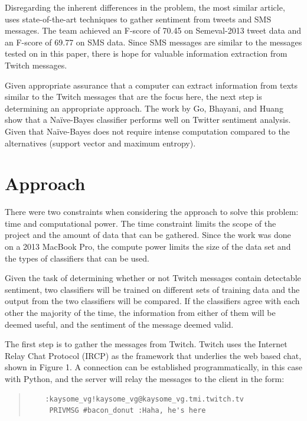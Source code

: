 \documentclass[12pt]{article}
\begin{document}
Disregarding the inherent differences in the problem, the most similar article, \cite{Kiritchenko:1} uses state-of-the-art techniques to gather sentiment from tweets and SMS messages. The team achieved an F-score of 70.45 on Semeval-2013 tweet data and an F-score of 69.77 on SMS data. Since SMS messages are similar to the messages tested on in this paper, there is hope for valuable information extraction from Twitch messages.

Given appropriate assurance that a computer can extract information from texts similar to the Twitch messages that are the focus here, the next step is determining an appropriate approach. The work by Go, Bhayani, and Huang \cite{go2009twitter} show that a Naïve-Bayes classifier performs well on Twitter sentiment analysis. Given that Naïve-Bayes does not require intense computation compared to the alternatives (support vector and maximum entropy). 
 

\section{Approach}

There were two constraints when considering the approach to solve this problem: time and computational power. The time constraint limits the scope of the project and the amount of data that can be gathered. Since the work was done on a 2013 MacBook Pro, the compute power limits the size of the data set and the types of classifiers that can be used. 

Given the task of determining whether or not Twitch messages contain detectable sentiment, two classifiers will be trained on different sets of training data and the output from the two classifiers will be compared. If the classifiers agree with each other the majority of the time, the information from either of them will be deemed useful, and the sentiment of the message deemed valid. 

The first step is to gather the messages from Twitch. Twitch uses the Internet Relay Chat Protocol (IRCP) as the framework that underlies the web based chat, shown in Figure 1. A connection can be established programmatically, in this case with Python, and the server will relay the messages to the client in the form:
\begin{quote}
\begin{center}
\begin{verbatim}
	:kaysome_vg!kaysome_vg@kaysome_vg.tmi.twitch.tv
	 PRIVMSG #bacon_donut :Haha, he's here
\end{verbatim}
\end{center}
\end{quote}
\end{document}
